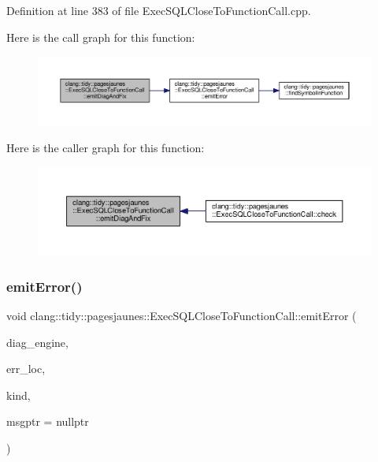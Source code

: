 Definition at line 383 of file Exec\+S\+Q\+L\+Close\+To\+Function\+Call.\+cpp.

Here is the call graph for this function\+:
\nopagebreak
\begin{figure}[H]
\begin{center}
\leavevmode
\includegraphics[width=350pt]{classclang_1_1tidy_1_1pagesjaunes_1_1_exec_s_q_l_close_to_function_call_a9a58f75cf980f02ab9f29ac4796e3913_cgraph}
\end{center}
\end{figure}
Here is the caller graph for this function\+:
\nopagebreak
\begin{figure}[H]
\begin{center}
\leavevmode
\includegraphics[width=350pt]{classclang_1_1tidy_1_1pagesjaunes_1_1_exec_s_q_l_close_to_function_call_a9a58f75cf980f02ab9f29ac4796e3913_icgraph}
\end{center}
\end{figure}
\mbox{\label{classclang_1_1tidy_1_1pagesjaunes_1_1_exec_s_q_l_close_to_function_call_a6cd603a678f16ede06a04049889bcf2a}} 
\subsubsection{\texorpdfstring{emit\+Error()}{emitError()}}
{\footnotesize\ttfamily void clang\+::tidy\+::pagesjaunes\+::\+Exec\+S\+Q\+L\+Close\+To\+Function\+Call\+::emit\+Error (\begin{DoxyParamCaption}\item[{Diagnostics\+Engine \&}]{diag\+\_\+engine,  }\item[{const Source\+Location \&}]{err\+\_\+loc,  }\item[{enum \hyperlink{classclang_1_1tidy_1_1pagesjaunes_1_1_exec_s_q_l_close_to_function_call_a4f10e8e9403eb403c7171a28d04288ae}{Exec\+S\+Q\+L\+Close\+To\+Function\+Call\+Error\+Kind}}]{kind,  }\item[{const std\+::string $\ast$}]{msgptr = {\ttfamily nullptr} }\end{DoxyParamCaption})}



